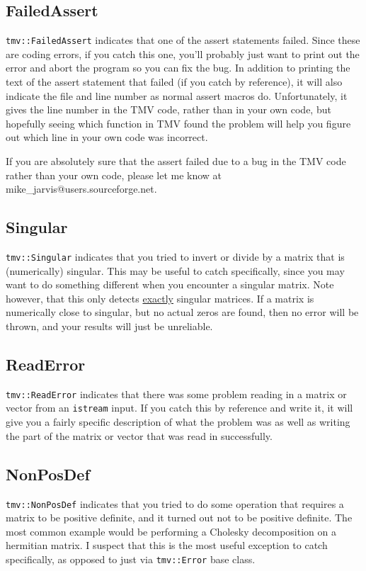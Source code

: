 \documentclass[twoside,letterpaper,11pt]{article}
\makeatletter
\renewcommand{\tt}[1]{{\texttt {#1}}}
\newcommand{\myemail}{mike\_jarvis@users.sourceforge.net}
\makeatother
\begin{document}
\subsection{FailedAssert}
\tt{tmv::FailedAssert} indicates that one of the assert statements failed.
Since these are coding errors,
if you catch this one, you'll probably just want to print out the error and abort
the program so you can fix the bug.  In addition to printing the text of the
assert statement that failed (if you catch by reference), it will also indicate
the file and line number as normal assert macros do.  Unfortunately, it gives the 
line number in the TMV code, rather than in your own code, but hopefully seeing
which function in TMV found the problem will help you figure out which line
in your own code was incorrect.

If you are absolutely sure that the assert failed due to a bug in the TMV code
rather than your own code, please let me know at \myemail.

\subsection{Singular}
\tt{tmv::Singular} indicates that you tried to invert or divide by a matrix
that is (numerically) singular.  This may be useful to catch specifically,
since you may want to do something different when you encounter a singular
matrix.  Note however, that this only detects \underline{exactly} singular
matrices.  If a matrix is numerically close to singular, but no actual 
zeros are found, then no error will be thrown, and your results will just be 
unreliable.

\subsection{ReadError}
\tt{tmv::ReadError} indicates that there was some problem reading in a matrix or 
vector from an \tt{istream} input.  If you catch this by reference and write it,
it will give you a fairly specific description of what the problem was as well as
writing the part of the matrix or vector that was read in successfully.

\subsection{NonPosDef}
\label{nonposdef}
\tt{tmv::NonPosDef} indicates that you tried to do some operation that requires
a matrix to be positive definite, and it turned out not to be positive definite.
The most common example would be performing a Cholesky decomposition on a 
hermitian matrix.  I suspect that this is the 
most useful exception to catch specifically, as opposed to just via \tt{tmv::Error} base class.
\end{document}

